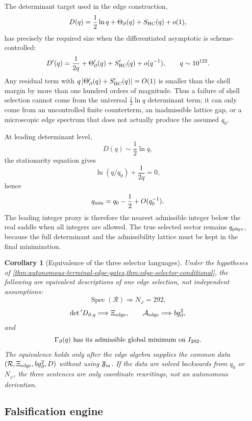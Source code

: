 \documentclass[aps,prd,reprint,nofootinbib,superscriptaddress,floatfix]{revtex4-2}
\numberwithin{equation}{section}
\theoremstyle{definition}
\theoremstyle{plain}
\newtheorem{corollary}{Corollary}[section]
\begin{document}
The determinant target used in the edge construction,
\[
D(q)
=
\frac12\ln q+\Theta_\partial(q)+S_{\rm HC}(q)+o(1),
\]
has precisely the required size when the differentiated asymptotic is
scheme-controlled:
\[
D'(q)
=
\frac{1}{2q}
+\Theta_\partial'(q)
+S_{\rm HC}'(q)
+o(q^{-1}),
\qquad
q\sim 10^{122}.
\]
Any residual term with \(q\,|\Theta_\partial'(q)+S_{\rm HC}'(q)|=O(1)\) is
smaller than the shell margin by more than one hundred orders of magnitude.
Thus a failure of shell selection cannot come from the universal
\(\frac12\ln q\) determinant term; it can only come from an uncontrolled finite
counterterm, an inadmissible lattice gap, or a microscopic edge spectrum that
does not actually produce the assumed \(q_0\).

At leading determinant level,
\[
D(q)\sim\frac12\ln q,
\]
the stationarity equation gives
\[
\ln(q/q_0)+\frac{1}{2q}=0,
\]
hence
\[
q_{\rm min}=q_0-\frac12+O(q_0^{-1}).
\]
The leading integer proxy is therefore the nearest admissible integer below
the real saddle when all integers are allowed.  The true selected sector
remains \(q_{\rm phys}\), because the full determinant and the admissibility
lattice must be kept in the final minimization.

\begin{corollary}[Equivalence of the three selector languages]
Under the hypotheses of
\cref{thm:autonomous-terminal-edge-gates,thm:edge-selector-conditional}, the
following are equivalent descriptions of one edge selection, not independent
assumptions:
\[
\operatorname{Spec}(\mathcal R)
\Longrightarrow N_\varphi=292,
\]
\[
\det{}'D_{\partial,q}\Longrightarrow\Xi_{\rm edge},
\qquad
\mathcal A_{\rm edge}\Longrightarrow b g_\partial^2,
\]
and
\[
\Gamma_\partial(q)
\ \hbox{has its admissible global minimum on } I_{292}.
\]
The equivalence holds only after the edge algebra supplies the common data
\((\mathcal R,\Xi_{\rm edge},b g_\partial^2,D)\) without using
\(\mathfrak F_{\rm in}\).  If the data are solved backwards from \(q_0\) or
\(N_\varphi\), the three sentences are only coordinate rewritings, not an
autonomous derivation.
\end{corollary}

\subsection{Falsification engine}
\end{document}
